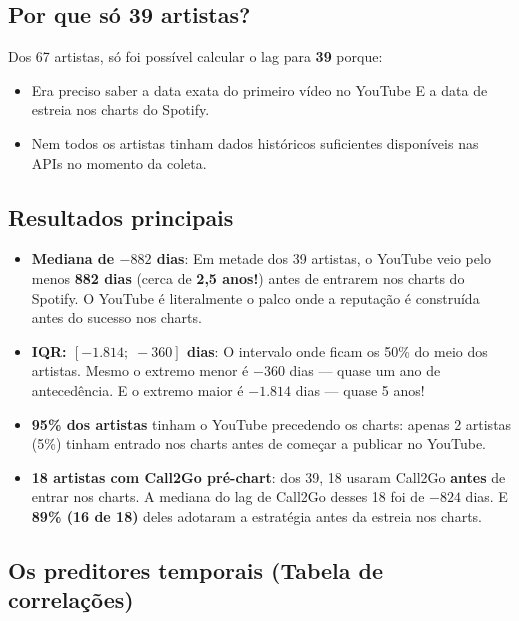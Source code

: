 \documentclass[12pt,a4paper]{article}
\newcommand{\num}[1]{\textcolor{azul}{\textbf{#1}}}
\begin{document}
\subsection{Por que só 39 artistas?}

Dos 67 artistas, só foi possível calcular o lag para \num{39} porque:
\begin{itemize}
  \item Era preciso saber a data exata do primeiro vídeo no YouTube E a data
        de estreia nos charts do Spotify.
  \item Nem todos os artistas tinham dados históricos suficientes disponíveis
        nas APIs no momento da coleta.
\end{itemize}

\subsection{Resultados principais}

\begin{itemize}
  \item \textbf{Mediana de $-882$ dias}: Em metade dos 39 artistas, o YouTube
        veio pelo menos \num{882 dias} (cerca de \num{2,5 anos!}) antes de
        entrarem nos charts do Spotify. O YouTube é literalmente o palco onde
        a reputação é construída antes do sucesso nos charts.

  \item \textbf{IQR: $[-1.814;\; -360]$ dias}: O intervalo onde ficam os 50\%
        do meio dos artistas. Mesmo o extremo menor é $-360$ dias --- quase um
        ano de antecedência. E o extremo maior é $-1.814$ dias --- quase 5
        anos!

  \item \textbf{95\% dos artistas} tinham o YouTube precedendo os charts:
        apenas 2 artistas (5\%) tinham entrado nos charts antes de começar a
        publicar no YouTube.

  \item \textbf{18 artistas com Call2Go pré-chart}: dos 39, 18 usaram Call2Go
        \textbf{antes} de entrar nos charts. A mediana do lag de Call2Go desses
        18 foi de $-824$ dias. E \num{89\% (16 de 18)} deles adotaram a
        estratégia antes da estreia nos charts.
\end{itemize}

\subsection{Os preditores temporais (Tabela de correlações)}
\end{document}

